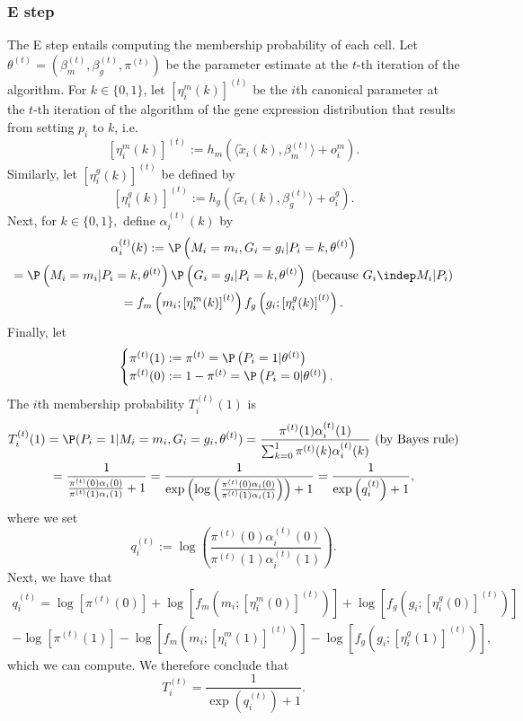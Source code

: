\documentclass[12pt]{article}
\begin{document}
\begin{appendices}
\subsubsection*{E step}
The E step entails computing the membership probability of each cell. Let $\theta^{(t)} = (\beta_m^{(t)}, \beta_g^{(t)}, \pi^{(t)})$ be the parameter estimate at the $t$-th iteration of the algorithm. For $k \in \{0,1\}$, let $[\eta^m_i(k)]^{(t)}$ be the $i$th canonical parameter at the $t$-th iteration of the algorithm of the gene expression distribution that results from setting $p_i$ to $k$, i.e.
$$
[\eta^m_i(k)]^{(t)} := h_m\left( \langle \tilde{x}_i(k) , \beta_m^{(t)} \rangle + o^m_i \right).
$$ Similarly, let $\left[\eta^g_i(k)\right]^{(t)}$ be defined by
$$\left[\eta^g_i(k)\right]^{(t)} :=  h_g\left( \langle \tilde{x}_i(k) , \beta_g^{(t)} \rangle + o^g_i \right).$$
Next, for $k \in \{0,1\},$ define $\alpha^{(t)}_i(k)$ by
\begin{multline*}
\alpha^{(t)}_i(k) := \P\left( M_i = m_i, G_i = g_i | P_i = k, \theta^{(t)} \right) \\ = \P\left( M_i = m_i | P_i = k, \theta^{(t)} \right) \P\left(G_i = g_i | P_i = k, \theta^{(t)} \right) \textrm{ (because $G_i \indep M_i | P_i$)} \\ = f_m\left(m_i; \left[ \eta^m_i(k) \right]^{(t)}\right) f_g\left(g_i; \left[ \eta^g_i(k) \right]^{(t)} \right).
\end{multline*}
Finally, let 
$$
\begin{cases}
\pi^{(t)}(1) := \pi^{(t)} = \P\left(P_i = 1 | \theta^{(t)} \right) \\
\pi^{(t)}(0) := 1 - \pi^{(t)} = \P\left(P_i = 0 | \theta^{(t)} \right).
\end{cases}
$$
The $i$th membership probability $T^{(t)}_i(1)$ is
\begin{multline}\label{e_step_1}
T^{(t)}_i(1) = \P(P_i = 1 | M_i = m_i, G_i = g_i, \theta^{(t)})  = \frac{\pi^{(t)}(1) \alpha^{(t)}_i(1)}{ \sum_{k=0}^1 \pi^{(t)}(k) \alpha^{(t)}_i(k)} \textrm{ (by Bayes rule)} \\ = \frac{1}{\frac{ \pi^{(t)}(0) \alpha_i(0)}{\pi^{(t)}(1) \alpha_i(1)} + 1} = \frac{1}{ \exp\left(\log\left(\frac{\pi^{(t)}(0) \alpha_i(0)}{\pi^{(t)}(1) \alpha_i(1)}\right)\right) + 1} = \frac{ 1 }{ \exp\left(q^{(t)}_i\right) + 1},
\end{multline}
where we set 
\begin{equation}\label{e_step_2}
q_i^{(t)} := \log\left(\frac{\pi^{(t)}(0) \alpha_i^{(t)}(0)}{\pi^{(t)}(1) \alpha_i^{(t)}(1)}\right).
\end{equation}
Next, we have that
\begin{multline*}
q^{(t)}_i = \log\left[ \pi^{(t)}(0) \right] + \log\left[ f_m\left(m_i; \left[ \eta^m_i(0) \right]^{(t)}\right) \right] + \log\left[ f_g\left(g_i; \left[ \eta^g_i(0) \right]^{(t)}\right) \right] \\ - \log\left[ \pi^{(t)}(1) \right] - \log\left[ f_m\left(m_i; \left[ \eta^m_i(1) \right]^{(t)}\right) \right] - \log\left[ f_g\left(g_i; \left[ \eta^g_i(1) \right]^{(t)}\right) \right],
\end{multline*}
which we can compute. We therefore conclude that
$$ T_i^{(t)} = \frac{1}{\exp\left(q^{(t)}_i\right) + 1}.$$

\end{appendices}
\end{document}
